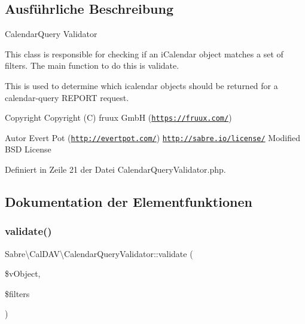 \subsection{Ausführliche Beschreibung}
Calendar\+Query Validator

This class is responsible for checking if an i\+Calendar object matches a set of filters. The main function to do this is \textquotesingle{}validate\textquotesingle{}.

This is used to determine which icalendar objects should be returned for a calendar-\/query R\+E\+P\+O\+RT request.

\begin{DoxyCopyright}{Copyright}
Copyright (C) fruux GmbH (\href{https://fruux.com/}{\tt https\+://fruux.\+com/}) 
\end{DoxyCopyright}
\begin{DoxyAuthor}{Autor}
Evert Pot (\href{http://evertpot.com/}{\tt http\+://evertpot.\+com/})  \href{http://sabre.io/license/}{\tt http\+://sabre.\+io/license/} Modified B\+SD License 
\end{DoxyAuthor}


Definiert in Zeile 21 der Datei Calendar\+Query\+Validator.\+php.



\subsection{Dokumentation der Elementfunktionen}
\mbox{\label{class_sabre_1_1_cal_d_a_v_1_1_calendar_query_validator_acc59d0c2a512557c9ad291e65762fe6c}} 
\subsubsection{\texorpdfstring{validate()}{validate()}}
{\footnotesize\ttfamily Sabre\textbackslash{}\+Cal\+D\+A\+V\textbackslash{}\+Calendar\+Query\+Validator\+::validate (\begin{DoxyParamCaption}\item[{\mbox{\hyperlink{class_sabre_1_1_v_object_1_1_component_1_1_v_calendar}{V\+Object\textbackslash{}\+Component\textbackslash{}\+V\+Calendar}}}]{\$v\+Object,  }\item[{array}]{\$filters }\end{DoxyParamCaption})}

